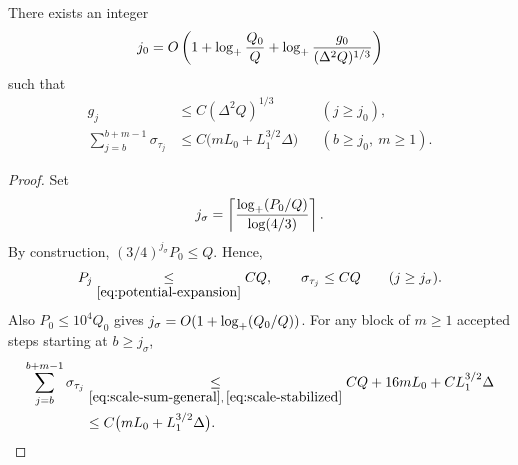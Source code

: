 \begin{lemma}
\label{lem:initial-stage}
There exists an integer
\begin{equation}\label{eq:initial-count}
 j_0=O\left(1+\log_+\frac{Q_0}{Q}
              +\log_+\frac{g_0}{(\Delta^2Q)^{1/3}}\right)
\end{equation}
such that
\begin{align}
 g_j&\le C(\Delta^2Q)^{1/3}
                         &&(j\ge j_0),\label{eq:initial-gradient}\\
 \sum_{j=b}^{b+m-1}\sigma_{\tau_j}
 &\le C\bigl(mL_0+L_1^{3/2}\Delta\bigr)
                         &&(b\ge j_0,\ m\ge1).
                         \label{eq:scale-sum}
\end{align}
\end{lemma}
\begin{proof}
Set
\[
 j_\sigma=\left\lceil\frac{\log_+(P_0/Q)}{\log(4/3)}\right\rceil.
\]
By construction, $(3/4)^{j_\sigma}P_0\le Q$.
Hence,
\begin{equation}\label{eq:scale-stabilized}
 P_j\underset{\eqref{eq:potential-expansion}}{\le}CQ,\qquad
 \sigma_{\tau_j}\le CQ\qquad(j\ge j_\sigma).
\end{equation}
Also $P_0\le10^4Q_0$ gives
$j_\sigma=O(1+\log_+(Q_0/Q))$.
For any block of $m\ge1$ accepted steps starting at $b\ge j_\sigma$,
\[
 \begin{aligned}
 \sum_{j=b}^{b+m-1}\sigma_{\tau_j}
 &\underset{\eqref{eq:scale-sum-general},\,\eqref{eq:scale-stabilized}}{\le}
 CQ+16mL_0+CL_1^{3/2}\Delta\\
 &\le C\bigl(mL_0+L_1^{3/2}\Delta\bigr).
 \end{aligned}
\]


\end{proof}
